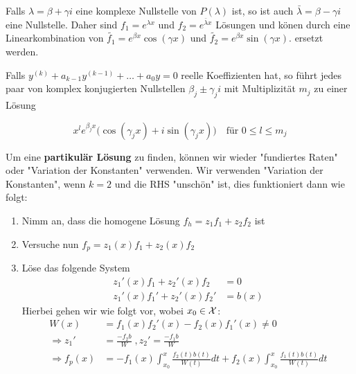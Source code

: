 Falls $\lambda = \beta + \gamma i$ eine komplexe Nullstelle von $P(\lambda)$ ist, so ist auch 
$\bar{\lambda} = \beta - \gamma i$ eine Nullstelle. Daher sind $f_1 = e^{\lambda x}$ und
$f_2 = e^{\bar{\lambda} x}$ Lösungen und könen durch eine Linearkombination von 
$\tilde{f_1} = e^{\beta x} \cos(\gamma x)$ und $\tilde{f_2} = e^{\beta x} \sin(\gamma x)$.
ersetzt werden. \medskip

Falls $y^{(k)} + a_{k-1}y^{(k-1)} + \dots + a_0 y = 0$ reelle Koeffizienten hat, so führt jedes paar von komplex
konjugierten Nullstellen $\beta_j \pm \gamma_j i$ mit Multiplizität $m_j$ zu einer Lösung

$$ x^l e^{\beta_j x} \Big( \cos(\gamma_j x) + i \sin(\gamma_j x) \Big) \quad \text{für }0 \leq l \leq m_j$$

Um eine \textbf{partikulär Lösung} zu finden, können wir wieder "fundiertes Raten" oder "Variation der 
Konstanten" verwenden. Wir verwenden "Variation der Konstanten", wenn $k = 2$ und die RHS "unschön" ist, dies
funktioniert dann wie folgt:

\begin{enumerate}[label=(\arabic*)]
  \item Nimm an, dass die homogene Lösung $f_h = z_1 f_1 + z_2 f_2$ ist
  \item Versuche nun $f_p = z_1(x) f_1 + z_2(x) f_2$
  \item Löse das folgende System
  \begin{align*}
    z_1'(x) f_1 + z_2'(x) f_2 &= 0\\
    z_1'(x) f_1' + z_2'(x) f_2' &= b(x)
  \end{align*}
  Hierbei gehen wir wie folgt vor, wobei $x_0 \in \mathcal{X}$:
  \begin{align*}
    W(x) &= f_1(x) f_2'(x) - f_2(x) f_1'(x) \neq 0\\
    \Rightarrow z_1' &= \frac{-f_2 b}{W} \; , z_2' = \frac{-f_1 b}{W}\\
    \Rightarrow f_p(x) &= -f_1(x) \int_{x_0}^x \frac{f_2(t) b(t)}{W(t)} dt + f_2(x) \int_{x_0}^x \frac{f_1(t) b(t)}{W(t)} dt
  \end{align*}
\end{enumerate}